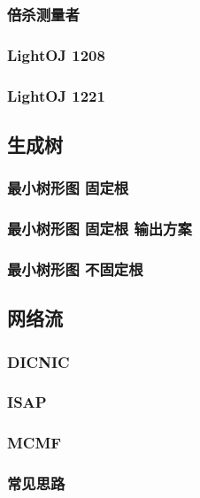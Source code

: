 \documentclass[10pt,a4paper]{article}
\begin{document}
\subsubsection{倍杀测量者}

\subsubsection{LightOJ 1208}

\subsubsection{LightOJ 1221}

\subsection{生成树}
\subsubsection{最小树形图 固定根}

\subsubsection{最小树形图 固定根 输出方案}

\subsubsection{最小树形图 不固定根}

\subsection{网络流}
\subsubsection{DICNIC}

\subsubsection{ISAP}

\subsubsection{MCMF}

\subsubsection{常见思路}

\end{document}
